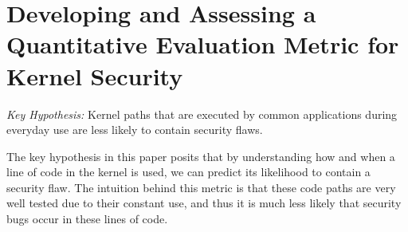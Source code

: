 \section{Developing and Assessing a Quantitative Evaluation Metric for Kernel Security}
\label{sec.metric}

\emph{Key Hypothesis:} Kernel paths that are executed by common applications 
during everyday use are less likely to contain security flaws.  

The key hypothesis in this paper posits that by understanding how and when
a line of code in the kernel is used, we can predict its likelihood to 
contain a security flaw.  
The intuition behind this metric is that these code paths are very well tested
due to their constant use, and thus it is much less likely that security bugs 
occur in these lines of code.  










%
%

